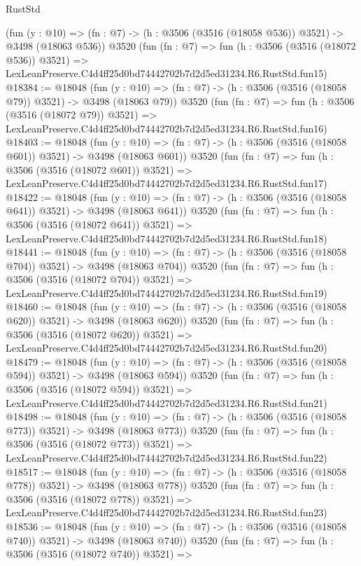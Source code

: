 \begin{lexlean}{RustStd}
\begin{coremodule}
    (fun (y : @10) => (fn : @7) -> (h : @3506 (@3516 (@18058 @536)) @3521) -> @3498 (@18063 @536))
    @3520
    (fun (fn : @7) =>
    fun (h : @3506 (@3516 (@18072 @536)) @3521) =>
    LexLeanPreserve.C4d4ff25d0bd74442702b7d2d5ed31234.R6.RustStd.fun15)
@18384 := @18048
    (fun (y : @10) => (fn : @7) -> (h : @3506 (@3516 (@18058 @79)) @3521) -> @3498 (@18063 @79))
    @3520
    (fun (fn : @7) =>
    fun (h : @3506 (@3516 (@18072 @79)) @3521) =>
    LexLeanPreserve.C4d4ff25d0bd74442702b7d2d5ed31234.R6.RustStd.fun16)
@18403 := @18048
    (fun (y : @10) => (fn : @7) -> (h : @3506 (@3516 (@18058 @601)) @3521) -> @3498 (@18063 @601))
    @3520
    (fun (fn : @7) =>
    fun (h : @3506 (@3516 (@18072 @601)) @3521) =>
    LexLeanPreserve.C4d4ff25d0bd74442702b7d2d5ed31234.R6.RustStd.fun17)
@18422 := @18048
    (fun (y : @10) => (fn : @7) -> (h : @3506 (@3516 (@18058 @641)) @3521) -> @3498 (@18063 @641))
    @3520
    (fun (fn : @7) =>
    fun (h : @3506 (@3516 (@18072 @641)) @3521) =>
    LexLeanPreserve.C4d4ff25d0bd74442702b7d2d5ed31234.R6.RustStd.fun18)
@18441 := @18048
    (fun (y : @10) => (fn : @7) -> (h : @3506 (@3516 (@18058 @704)) @3521) -> @3498 (@18063 @704))
    @3520
    (fun (fn : @7) =>
    fun (h : @3506 (@3516 (@18072 @704)) @3521) =>
    LexLeanPreserve.C4d4ff25d0bd74442702b7d2d5ed31234.R6.RustStd.fun19)
@18460 := @18048
    (fun (y : @10) => (fn : @7) -> (h : @3506 (@3516 (@18058 @620)) @3521) -> @3498 (@18063 @620))
    @3520
    (fun (fn : @7) =>
    fun (h : @3506 (@3516 (@18072 @620)) @3521) =>
    LexLeanPreserve.C4d4ff25d0bd74442702b7d2d5ed31234.R6.RustStd.fun20)
@18479 := @18048
    (fun (y : @10) => (fn : @7) -> (h : @3506 (@3516 (@18058 @594)) @3521) -> @3498 (@18063 @594))
    @3520
    (fun (fn : @7) =>
    fun (h : @3506 (@3516 (@18072 @594)) @3521) =>
    LexLeanPreserve.C4d4ff25d0bd74442702b7d2d5ed31234.R6.RustStd.fun21)
@18498 := @18048
    (fun (y : @10) => (fn : @7) -> (h : @3506 (@3516 (@18058 @773)) @3521) -> @3498 (@18063 @773))
    @3520
    (fun (fn : @7) =>
    fun (h : @3506 (@3516 (@18072 @773)) @3521) =>
    LexLeanPreserve.C4d4ff25d0bd74442702b7d2d5ed31234.R6.RustStd.fun22)
@18517 := @18048
    (fun (y : @10) => (fn : @7) -> (h : @3506 (@3516 (@18058 @778)) @3521) -> @3498 (@18063 @778))
    @3520
    (fun (fn : @7) =>
    fun (h : @3506 (@3516 (@18072 @778)) @3521) =>
    LexLeanPreserve.C4d4ff25d0bd74442702b7d2d5ed31234.R6.RustStd.fun23)
@18536 := @18048
    (fun (y : @10) => (fn : @7) -> (h : @3506 (@3516 (@18058 @740)) @3521) -> @3498 (@18063 @740))
    @3520
    (fun (fn : @7) =>
    fun (h : @3506 (@3516 (@18072 @740)) @3521) =>

\end{coremodule}
\end{lexlean}
